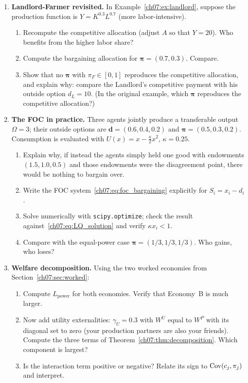\documentclass[../structural_economics_book.tex]{subfiles}
\begin{document}
\begin{enumerate}[label=\textbf{7.\arabic*}, leftmargin=3em]

\item \textbf{Landlord-Farmer revisited.} In Example~\ref{ch07:ex:landlord}, suppose the production function is $Y = K^{0.3}L^{0.7}$ (more labor-intensive).
\begin{enumerate}
\item Recompute the competitive allocation (adjust $A$ so that $Y = 20$). Who benefits from the higher labor share?
\item Compute the bargaining allocation for $\boldsymbol{\pi} = (0.7, 0.3)$. Compare.
\item Show that no $\boldsymbol{\pi}$ with $\pi_F \in [0,1]$ reproduces the competitive allocation, and explain why: compare the Landlord's competitive payment with his outside option $d_L = 10$. (In the original example, which $\boldsymbol{\pi}$ reproduces the competitive allocation?)
\end{enumerate}

\item \textbf{The FOC in practice.} Three agents jointly produce a transferable output $\Omega = 3$; their outside options are $\boldsymbol{d} = (0.6, 0.4, 0.2)$ and $\boldsymbol{\pi} = (0.5, 0.3, 0.2)$. Consumption is evaluated with $U(x) = x - \frac{\kappa}{2}x^2$, $\kappa = 0.25$.
\begin{enumerate}
\item Explain why, if instead the agents simply held one good with endowments $(1.5, 1.0, 0.5)$ and those endowments were the disagreement point, there would be nothing to bargain over.
\item Write the FOC system~\eqref{ch07:eq:foc_bargaining} explicitly for $S_i = x_i - d_i$.
\item Solve numerically with \texttt{scipy.optimize}; check the result against~\eqref{ch07:eq:LQ_solution} and verify $\kappa x_i < 1$.
\item Compare with the equal-power case $\boldsymbol{\pi} = (1/3, 1/3, 1/3)$. Who gains, who loses?
\end{enumerate}

\item \textbf{Welfare decomposition.} Using the two worked economies from Section~\ref{ch07:sec:worked}:
\begin{enumerate}
\item Compute $L_{\text{power}}$ for both economies. Verify that Economy~B is much larger.
\item Now add utility externalities: $\gamma_U = 0.3$ with $W^U$ equal to $W^P$ with its diagonal set to zero (your production partners are also your friends). Compute the three terms of Theorem~\ref{ch07:thm:decomposition}. Which component is largest?
\item Is the interaction term positive or negative? Relate its sign to $\operatorname{Cov}(c_j, \pi_j)$ and interpret.
\end{enumerate}


\end{enumerate}
\end{document}

